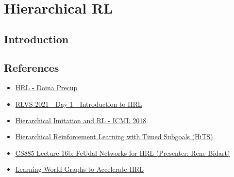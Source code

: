 \chapter{Hierarchical RL}

\section{Introduction}

\section{References}

\begin{itemize}
	\item \href{https://youtu.be/e8b0yC6COJ8}{\ac{HRL} - Doina Precup}
	\item \href{https://youtu.be/kSFjMely5q8}{RLVS 2021 - Day 1 - Introduction to \ac{HRL}}
	\item \href{https://youtu.be/zQy02LsARo0}{Hierarchical Imitation and RL - ICML 2018}
	\item \href{https://youtu.be/JkPaI3uZU6c}{Hierarchical Reinforcement Learning with Timed Subgoals (HiTS)}
	\item \href{https://youtu.be/DLVjU75x0WQ}{CS885 Lecture 16b: FeUdal Networks for \ac{HRL} (Presenter: Rene Bidart)}
	\item \href{https://youtu.be/Qk4lJdp7ZAs}{Learning World Graphs to Accelerate \ac{HRL}}
\end{itemize}